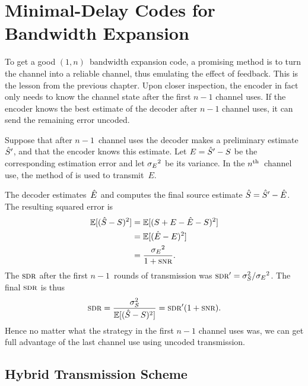 \chapter{Minimal-Delay Codes for Bandwidth Expansion}

To get a good $(1,n)$~bandwidth expansion code, a promising method is to turn
the channel into a reliable channel, thus emulating the effect of feedback. This
is the lesson from the previous chapter. Upon closer inspection, the encoder in
fact only needs to know the channel state after the first $n-1$ channel uses. If
the encoder knows the best estimate of the decoder after $n-1$ channel uses, it
can send the remaining error uncoded. 

Suppose that after $n-1$~channel uses the decoder makes a preliminary
estimate~${\hat{S}}'$, and that the encoder knows this estimate. Let $E = {\hat{S}}' - S$ be
the corresponding estimation error and let ${{\sigma_E}^2}$ be its variance. In the
$n{^{\text{th}}}$~channel use, the method of  is used to transmit~$E$.

The decoder estimates~$\hat{E}$ and computes the final source estimate ${\hat{S}} = {\hat{S}}' -
\hat{E}$. The resulting squared error is
\begin{align*}
  \E[(\Sh - S)^2] &= \E[(S + E - \Eh - S)^2] \\
  &= \E[(\Eh - E)^2] \\
  &= \frac{\seq}{1 + \snr}.
\end{align*}
The $\sdr$ after the first $n-1$~rounds of transmission was $\sdr' = \ssq/\seq$.
The final $\sdr$ is thus
\begin{equation*}
  \sdr = \frac{\ssq}{\E[(\Sh - S)^2]} = \sdr' (1 + \snr).
\end{equation*}
Hence no matter what the strategy in the first $n-1$ channel uses was, we can
get full advantage of the last channel use using uncoded transmission.





\section{Hybrid Transmission Scheme}\label{sec:hybridscheme}

